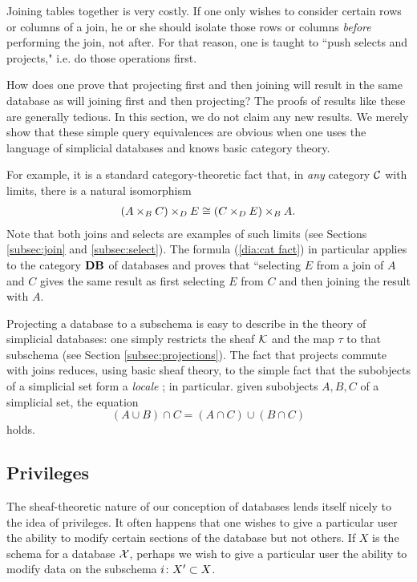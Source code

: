 \documentclass{amsart}
\begin{document}
Joining tables together is very costly.  If one only wishes to consider certain rows or columns of a join, he or she should isolate those rows or columns {\em before} performing the join, not after.  For that reason, one is taught to ``push selects and projects," i.e. do those operations first.

How does one prove that projecting first and then joining will result in the same database as will joining first and then projecting?  The proofs of results like these are generally tedious.  In this section, we do not claim any new results.  We merely show that these simple query equivalences are obvious when one uses the language of simplicial databases and knows basic category theory. 

For example, it is a standard category-theoretic fact that, in {\em any} category $\mathcal{C}$ with limits, there is a natural isomorphism \begin{eqnarray}\label{dia:cat fact}(A\times_BC)\times_DE\cong (C\times_DE)\times_BA.\end{eqnarray}  Note that both joins and selects are examples of such limits (see Sections \ref{subsec:join} and \ref{subsec:select}).  The formula (\ref{dia:cat fact}) in particular applies to the category ${\bf DB}$ of databases and proves that ``selecting $E$ from a join of $A$ and $C$ gives the same result as first selecting $E$ from $C$ and then joining the result with $A$.

Projecting a database to a subschema is easy to describe in the theory of simplicial databases: one simply restricts the sheaf $\mathcal{K}$ and the map $\tau$ to that subschema (see Section \ref{subsec:projections}).  The fact that projects commute with joins reduces, using basic sheaf theory, to the simple fact that the subobjects of a simplicial set form a {\em locale} \cite[1.3.2]{Bor3}; in particular. given subobjects $A,B,C$ of a simplicial set, the equation $$(A\cup B)\cap C=(A\cap C)\cup (B\cap C)$$ holds.  

\subsection{Privileges}\label{subsec:privileges}

The sheaf-theoretic nature of our conception of databases lends itself nicely to the idea of privileges.  It often happens that one wishes to give a particular user the ability to modify certain sections of the database but not others.  If $X$ is the schema for a database $\mathcal{X}$, perhaps we wish to give a particular user the ability to modify data on the subschema $i\colon X'\subset X$.  
\end{document}
